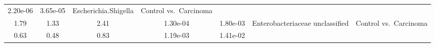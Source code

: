 \documentclass[12pt,]{article}
\begin{document}
\begin{longtable}[]{@{}ccccccc@{}}
\begin{minipage}[t]{0.08\columnwidth}
2.20e-06\strut
\end{minipage} & \begin{minipage}[t]{0.08\columnwidth}\centering\strut
3.65e-05\strut
\end{minipage} & \begin{minipage}[t]{0.23\columnwidth}\centering\strut
Escherichia.Shigella\strut
\end{minipage} & \begin{minipage}[t]{0.16\columnwidth}\centering\strut
Control vs.~Carcinoma\strut
\end{minipage}\tabularnewline
\begin{minipage}[t]{0.06\columnwidth}\centering\strut
1.79\strut
\end{minipage} & \begin{minipage}[t]{0.10\columnwidth}\centering\strut
1.33\strut
\end{minipage} & \begin{minipage}[t]{0.10\columnwidth}\centering\strut
2.41\strut
\end{minipage} & \begin{minipage}[t]{0.08\columnwidth}\centering\strut
1.30e-04\strut
\end{minipage} & \begin{minipage}[t]{0.08\columnwidth}\centering\strut
1.80e-03\strut
\end{minipage} & \begin{minipage}[t]{0.23\columnwidth}\centering\strut
Enterobacteriaceae unclassified\strut
\end{minipage} & \begin{minipage}[t]{0.16\columnwidth}\centering\strut
Control vs.~Carcinoma\strut
\end{minipage}\tabularnewline
\begin{minipage}[t]{0.06\columnwidth}\centering\strut
0.63\strut
\end{minipage} & \begin{minipage}[t]{0.10\columnwidth}\centering\strut
0.48\strut
\end{minipage} & \begin{minipage}[t]{0.10\columnwidth}\centering\strut
0.83\strut
\end{minipage} & \begin{minipage}[t]{0.08\columnwidth}\centering\strut
1.19e-03\strut
\end{minipage} & \begin{minipage}[t]{0.08\columnwidth}\centering\strut
1.41e-02\strut
\end{minipage} & \begin{minipage}[t]{0.23\columnwidth}\centering\strut

\end{minipage}
\end{longtable}
\end{document}
